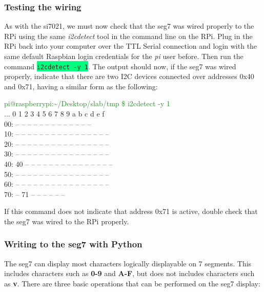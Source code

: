 \documentclass{article}
\newcommand*{\myfont}{\fontfamily{pcr}\selectfont}
\newcommand{\codei}[1]{\colorbox{SpringGreen}{\texttt{#1}}} %
\newcommand{\outputb}[2]{
  \begin{tcolorbox}[width=\textwidth,colback={light-gray},title={#1},colbacktitle=gray,coltitle=light-gray]
    \myfont
    #2
  \end{tcolorbox}
} %
\begin{document}
  \subsubsection{Testing the wiring}
  As with the si7021, we must now check that the seg7 was wired properly to the RPi using the same \textit{i2cdetect} tool in the command line on the RPi. Plug in the RPi back into your computer over the TTL Serial connection and login with the same default Raspbian login credentials for the \textit{pi} user before. Then run the command \codei{i2cdetect -y 1}. The output should now, if the seg7 was wired properly, indicate that there are two I2C devices connected over addresses 0x40 and 0x71, having a similar form as the following:
  \outputb{I2C detection output (seg7 and si7021 both wired)}
 {
    \textcolor{ForestGreen}{pi@raspberrypi:\textasciitilde/Desktop/slab/tmp \$ i2cdetect -y 1} \\
    ...  0  1  2  3  4  5  6  7  8  9  a  b  c  d  e  f \\
    00:          -- -- -- -- -- -- -- -- -- -- -- -- -- \\
    10: -- -- -- -- -- -- -- -- -- -- -- -- -- -- -- -- \\
    20: -- -- -- -- -- -- -- -- -- -- -- -- -- -- -- -- \\
    30: -- -- -- -- -- -- -- -- -- -- -- -- -- -- -- -- \\
    40: 40 -- -- -- -- -- -- -- -- -- -- -- -- -- -- -- \\
    50: -- -- -- -- -- -- -- -- -- -- -- -- -- -- -- -- \\
    60: -- -- -- -- -- -- -- -- -- -- -- -- -- -- -- -- \\
    70: -- 71 -- -- -- -- -- --
  }
  If this command does not indicate that address 0x71 is active, double check that the seg7 was wired to the RPi properly.
  \subsubsection{Writing to the seg7 with Python}
  The seg7 can display most characters logically displayable on 7 segments. This includes characters such as \textbf{0-9} and \textbf{A-F}, but does not includes characters such as \textbf{v}. There are three basic operations that can be performed on the seg7 display:
\end{document}
